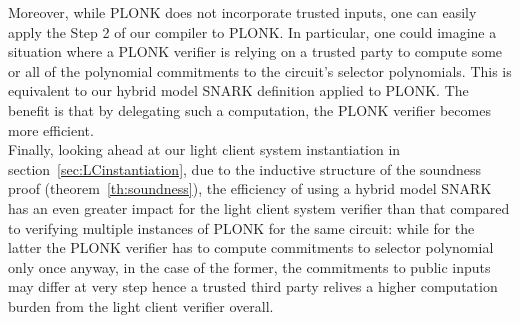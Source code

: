 \noindent Moreover, while PLONK does not incorporate trusted inputs, one can easily apply the Step 2 of our compiler to PLONK. In particular, one could imagine a situation 
where a PLONK verifier is relying on a trusted party to compute some or all of the polynomial commitments to the circuit's selector polynomials. This is equivalent to our hybrid 
model SNARK definition applied to PLONK. The benefit is that by delegating such a computation, the PLONK verifier becomes more efficient. \\ %


\noindent Finally, looking ahead at our light client system instantiation in section~\ref{sec:LCinstantiation}, due to the inductive structure of the soundness proof (theorem~\ref{th:soundness}), 
the efficiency of using a hybrid model SNARK has an even greater impact for the light client system verifier than that compared to verifying multiple instances of PLONK for the same circuit:
while for the latter the PLONK verifier has to compute commitments to selector polynomial only once anyway, in the case of the former, the commitments to public inputs may differ at very step hence a trusted third party relives a higher computation burden from the light client verifier overall. 


